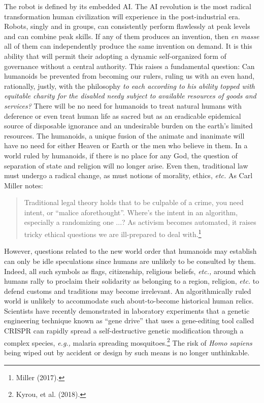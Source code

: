 \begin{multicols}{2}
The robot is defined by its embedded AI. The AI revolution is the most radical transformation human civilization will experience in the post-industrial era. Robots, singly and in groups, can consistently perform flawlessly at peak levels and can combine peak skills. If any of them produces an invention, then \textit{en masse} all of them can independently produce the same invention on demand. It is this ability that will permit their adopting a dynamic self-organized form of governance without a central authority. This raises a fundamental question: Can humanoids be prevented from becoming our rulers, ruling us with an even hand, rationally, justly, with the philosophy \textit{to each according to his ability topped with equitable charity for the disabled needy subject to available resources of goods and services?} There will be no need for humanoids to treat natural humans with deference or even treat human life as sacred but as an eradicable epidemical source of disposable ignorance and an undesirable burden on the earth's limited resources. The humanoids, a unique fusion of the animate and inanimate will have no need for either Heaven or Earth or the men who believe in them. In a world ruled by humanoids, if there is no place for any God, the question of separation of state and religion will no longer arise. Even then, traditional law must undergo a radical change, as must notions of morality, ethics, \textit{etc.} As Carl Miller notes:
\begin{quote}
Traditional legal theory holds that to be culpable of a crime, you need intent, or “malice aforethought”. Where's the intent in an algorithm, especially a randomizing one ...? As activism becomes automated, it raises tricky ethical questions we are ill-prepared to deal with.\footnote{Miller (2017).}
\end{quote}

  However, questions related to the new world order that humanoids may establish can only be idle speculations since humans are unlikely to be consulted by them. Indeed, all such symbols as flags, citizenship, religious beliefs, \textit{etc.,} around which humans rally to proclaim their solidarity as belonging to a region, religion, \textit{etc.} to defend customs and traditions may become irrelevant. An algorithmically ruled world is unlikely to accommodate such about-to-become historical human relics. Scientists have recently demonstrated in laboratory experiments that a genetic engineering technique known as “gene drive” that uses a gene-editing tool called CRISPR can rapidly spread a self-destructive genetic modification through a complex species, \textit{e.g.,} malaria spreading mosquitoes.\footnote{Kyrou, et al. (2018).}  The risk of \textit{Homo sapiens} being wiped out by accident or design by such means is no longer unthinkable.


\end{multicols}
